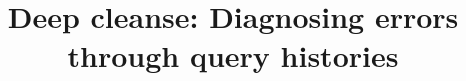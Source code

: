 



\newcommand{\red}[1]{\textcolor{red}{#1}}
\newcommand{\green}[1]{\textcolor{green}{#1}}
\newcommand{\blue}[1]{\textcolor{blue}{#1}}
\newcommand{\orange}[1]{\textcolor{orange}{#1}}
\newcommand{\darkred}[1]{\textcolor{darkred}{#1}}
\newcommand{\darkgreen}[1]{\textcolor{darkgreen}{#1}}
\newcommand{\darkblue}[1]{\textcolor{darkblue}{#1}}


\newcommand{\alex}[1]{\noindent{\color{darkgreen}{Alexandra: #1}}}
\newcommand{\xlw}[1]{\noindent{\color{blue}{Xiaolan: #1}}}
\newcommand{\ewu}[1]{\noindent{\color{red}{EWu: #1}}}
\newcommand{\stitle}[1]{\vspace{0.5em}\noindent\textbf{#1}}
\newcommand{\calF}[0]{$\cal{F}$}
\newcommand{\codesize}{\fontsize{7}{8}}
\newcommand{\xxx}[1]{{\fontsize{13pt}{13pt}\selectfont\textcolor{red}{#1}}}
\newcommand{\ind}{\hspace{\algorithmicindent}}
\newcommand{\sys}{\textsc{DeepCleanse}\xspace}
\newcommand{\gcost}{{\sc Greedy-Cost}\xspace}

\newcommand{\deprecate}[1]{}





\title{Deep cleanse: Diagnosing errors through query histories}


